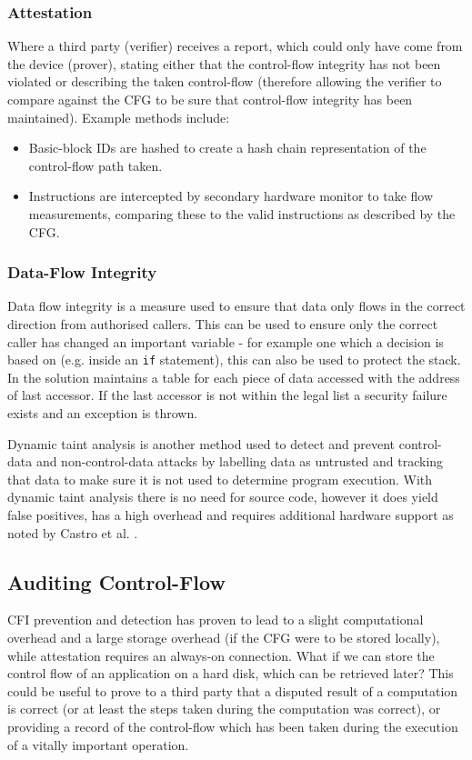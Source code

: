 \subsubsection*{Attestation}
Where a third party (verifier) receives a report, which could only have come from the device (prover), stating either that the control-flow integrity has not been violated or describing the taken control-flow (therefore allowing the verifier to compare against the CFG to be sure that control-flow integrity has been maintained). Example methods include:
\begin{itemize}
	\item Basic-block IDs are hashed to create a hash chain representation of the control-flow path taken.
	\item Instructions are intercepted by secondary hardware monitor to take flow measurements, comparing these to the valid instructions as described by the CFG.
\end{itemize}

\subsubsection*{Data-Flow Integrity}

Data flow integrity \cite{Castro2006} is a measure used to ensure that data only flows in the correct direction from authorised callers. This can be used to ensure only the correct caller has changed an important variable - for example one which a decision is based on (e.g. inside an \verb|if| statement), this can also be used to protect the stack.
In  \cite{Castro2006} the solution maintains a table for each piece of data accessed with the address of last accessor. If the last accessor is not within the legal list a security failure exists and an exception is thrown.

Dynamic taint analysis \cite{Davi2009} is another method used to detect and prevent control-data and non-control-data attacks by labelling data as untrusted and tracking that data to make sure it is not used to determine program execution. With dynamic taint analysis there is no need for source code, however it does yield false positives, has a high overhead and requires additional hardware support as noted by Castro et al. \cite{Castro2006}.

\subsection{Auditing Control-Flow}
CFI prevention and detection has proven to lead to a slight computational overhead \cite{DeClercq2017} and a large storage overhead (if the CFG were to be stored locally), while attestation requires an always-on connection. What if we can store the control flow of an application on a hard disk, which can be retrieved later? This could be useful to prove to a third party that a disputed result of a computation is correct (or at least the steps taken during the computation was correct), or providing a record of the control-flow which has been taken during the execution of a  vitally important operation.

